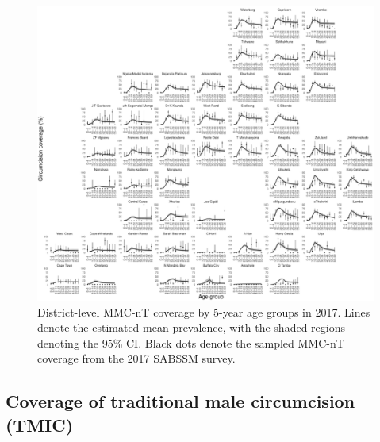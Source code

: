 \documentclass{article}
\begin{document}
\begin{appendix}
\begin{figure}[H]
	\centering
	\includegraphics[width = \linewidth]{Figures/suppmat/ModelFit/MMCnTPrev_5year_District_2017_withsurveypoints}
	\caption{District-level MMC-nT coverage by 5-year age groups in 2017. Lines denote the estimated mean prevalence, with the shaded regions denoting the 95\% CI. Black dots denote the sampled MMC-nT coverage from the 2017 SABSSM survey.}
\end{figure}


\subsection{Coverage of traditional male circumcision (TMIC)}



\end{appendix}
\end{document}
